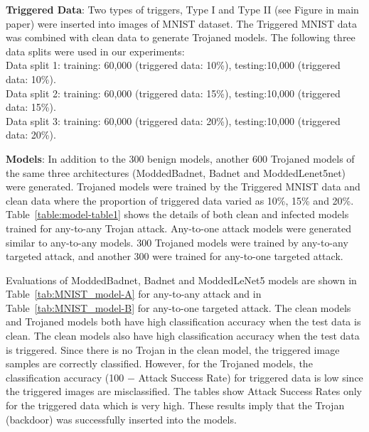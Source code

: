 \documentclass{article}
\begin{document}
\textbf{Triggered Data}: Two types of triggers, Type I and Type II (see Figure in main paper) were inserted into  images of MNIST dataset.
The Triggered MNIST data was combined with clean data to generate Trojaned models. The following three data splits were used in our experiments:\\
Data split 1: training: 60,000 (triggered data: 10\%),  testing:10,000 (triggered data: 10\%).\\
Data split 2: training: 60,000 (triggered data: 15\%),  testing:10,000 (triggered data: 15\%).\\
Data split 3: training: 60,000 (triggered data: 20\%),  testing:10,000 (triggered data: 20\%).
    
\textbf{Models}: 
In addition to the 300 benign models, another 600 Trojaned models of the same three architectures (ModdedBadnet, Badnet and ModdedLenet5net) were generated. 
 Trojaned models were trained by the Triggered MNIST data and clean data where the proportion of triggered data varied as 10\%, 15\% and 20\%. Table~\ref{table:model-table1} shows the details of both clean  and infected models trained for any-to-any Trojan attack. Any-to-one attack models were generated similar to any-to-any models.
300 Trojaned models were trained by any-to-any targeted attack, and another 300 were trained for any-to-one targeted attack.

Evaluations of ModdedBadnet, Badnet and ModdedLeNet5 models are shown in Table~\ref{tab:MNIST_model-A} for any-to-any attack and in Table~\ref{tab:MNIST_model-B} for any-to-one targeted attack. The clean models and Trojaned models both have high classification accuracy when the test data is clean. The clean  models also have high classification accuracy when the test data is triggered. Since there is no Trojan in the clean model, the triggered image samples are correctly classified. However, for the Trojaned models, the classification accuracy (100 $-$ Attack Success Rate) for triggered data is low since the triggered images are misclassified. The tables show Attack Success Rates only for the triggered data which is very high. These results imply that the Trojan (backdoor) was successfully inserted into the models.
\end{document}
